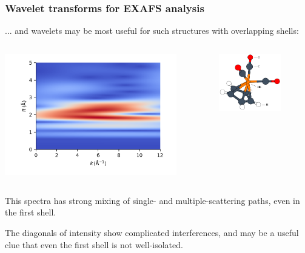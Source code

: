 
\begin{frame} \frametitle{Wavelet transforms for EXAFS analysis}


... and wavelets may be most useful for such structures with overlapping shells:



\begin{columns}
  \begin{column}[T]{75mm}
    \includegraphics[width=75mm]{figs/wavelets/mnco3cp_data_mag}
  \end{column}
  \begin{column}[T]{25mm}

    \vspace{5mm}

  \hspace{-7mm}\includegraphics[width=27mm]{figs/wavelets/mnco3}

\end{column}
\end{columns}

\vmm

\begin{cenpage}{90mm}
This spectra has strong mixing of single- and multiple-scattering
paths, even in the first shell.

\vmm

The diagonals of intensity show complicated interferences, and may
be a useful clue that even the first shell is not well-isolated.


\end{cenpage}

\end{frame}
